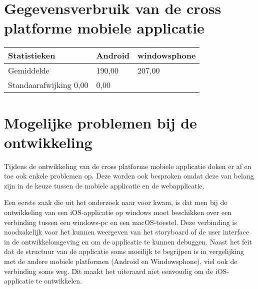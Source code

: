 \section{Gegevensverbruik van de cross platforme mobiele applicatie}

\begin{center}
\begin{tabular}{| l | l | l |}
  \hline
  Statistieken & Android & windowsphone\\ \hline
  Gemiddelde & 190,00 & 207,00 \\ \hline
  Standaarafwijking 0,00 & 0,00 \\ \hline
\end{tabular}
\end{center}

\section{Mogelijke problemen bij de ontwikkeling}
Tijdens de ontwikkeling van de cross platforme mobiele applicatie doken er af en toe ook enkele problemen op.
Deze worden ook besproken omdat deze van belang zijn in de keuze tussen de mobiele applicatie en de webapplicatie.

Een eerste zaak die uit het onderzoek naar voor kwam, is dat men bij de ontwikkeling van een iOS-applicatie op windows moet beschikken
over een verbinding tussen een windows-pc en een macOS-toestel. Deze verbinding is noodzakelijk voor het kunnen weergeven van
het storyboard of de user interface in de ontwikkelomgeving en om de applicatie te kunnen debuggen. Naast het feit dat de structuur van de applicatie
soms moeilijk te begrijpen is in vergelijking met de andere mobiele platformen (Android en Windowsphone), viel ook de verbinding soms weg.
Dit maakt het uiteraard niet eenvoudig om de iOS-applicatie te ontwikkelen.
